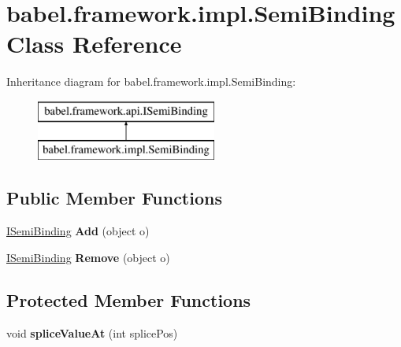 \hypertarget{classbabel_1_1framework_1_1impl_1_1_semi_binding}{\section{babel.\-framework.\-impl.\-Semi\-Binding Class Reference}
\label{classbabel_1_1framework_1_1impl_1_1_semi_binding}
}
Inheritance diagram for babel.\-framework.\-impl.\-Semi\-Binding\-:\begin{figure}[H]
\begin{center}
\leavevmode
\includegraphics[height=2.000000cm]{classbabel_1_1framework_1_1impl_1_1_semi_binding}
\end{center}
\end{figure}
\subsection*{Public Member Functions}
\begin{DoxyCompactItemize}
\item 
\hypertarget{classbabel_1_1framework_1_1impl_1_1_semi_binding_af0aa9e444b295c2791f0f60fac5eae43}{\hyperlink{interfacebabel_1_1framework_1_1api_1_1_i_semi_binding}{I\-Semi\-Binding} {\bfseries Add} (object o)}\label{classbabel_1_1framework_1_1impl_1_1_semi_binding_af0aa9e444b295c2791f0f60fac5eae43}

\item 
\hypertarget{classbabel_1_1framework_1_1impl_1_1_semi_binding_aea3e0fe7ca81b19c04e20d1663f78c07}{\hyperlink{interfacebabel_1_1framework_1_1api_1_1_i_semi_binding}{I\-Semi\-Binding} {\bfseries Remove} (object o)}\label{classbabel_1_1framework_1_1impl_1_1_semi_binding_aea3e0fe7ca81b19c04e20d1663f78c07}

\end{DoxyCompactItemize}
\subsection*{Protected Member Functions}
\begin{DoxyCompactItemize}
\item 
\hypertarget{classbabel_1_1framework_1_1impl_1_1_semi_binding_a07bce04b8ed6828623543974d79565fb}{void {\bfseries splice\-Value\-At} (int splice\-Pos)}\label{classbabel_1_1framework_1_1impl_1_1_semi_binding_a07bce04b8ed6828623543974d79565fb}

\end{DoxyCompactItemize}
